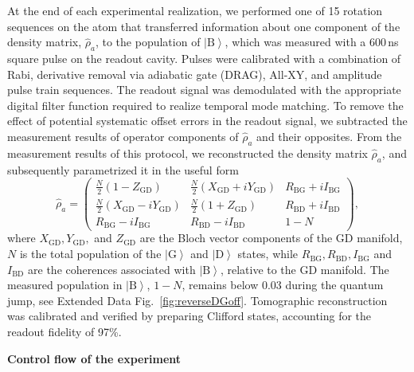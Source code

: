 \documentclass[
	 			preprint,     		superscriptaddress, 																longbibliography,
		amsmath, amssymb,
		aps,  prb,   		floatfix,
		linenumbers     
	]{revtex4-1}
\newcommand{\ket}[1]{\left|#1\right>}
\begin{document}
At the end of each experimental realization, we performed one of 15 rotation sequences on the atom that transferred information about one component of the density matrix, $\hat{\rho}_a$, to the population of $\ket{\mathrm{B}}$, which was measured with a 600\,ns square pulse on the readout cavity.
Pulses were calibrated with a combination of Rabi, derivative removal via adiabatic gate (DRAG), All-XY, and amplitude pulse train sequences. 
The readout signal was demodulated with the appropriate digital filter function required to realize temporal mode matching.
To remove the effect of potential systematic offset errors in the readout signal, we subtracted the measurement results of operator components of  $\hat{\rho}_a$ and their opposites.
From the measurement results of this protocol, we reconstructed the density matrix $\hat{\rho}_a$, and subsequently parametrized it in the useful form
$$\hat{\rho}_a = \begin{pmatrix}\frac{N}{2}\left(1-Z_{\mathrm{GD}}\right) & \frac{N}{2}\left(X_{\mathrm{GD}}+i Y_{\mathrm{GD}}\right) & R_{\mathrm{BG}}+i I_{\mathrm{BG}}\\
\frac{N}{2}\left(X_{\mathrm{ GD}}-i Y_{\mathrm{GD}}\right) & \frac{N}{2}\left(1+Z_{\mathrm{GD}}\right) & R_{\mathrm{BD}}+i I_{\mathrm{BD}}\\
R_{\mathrm{BG}}-i I_{\mathrm{BG}} & R_{\mathrm{BD}}-i I_{\mathrm{BD}} & 1-N
\end{pmatrix}, 
$$ where $X_\mathrm{GD}, Y_\mathrm{GD},$ and $Z_\mathrm{GD}$ are the Bloch vector components of the GD manifold, $N$ is the total population of  the $\ket{\mathrm{G}}$ and $\ket{\mathrm{D}}$ states, while $R_{\mathrm{BG}},  R_{\mathrm{BD}}, I_{\mathrm{BG}}$ and $I_{\mathrm{BD}}$ are the coherences associated with $\ket{\mathrm{B}}$, relative to the GD manifold. 
The measured population in $\ket{\mathrm{B}}$, $1-N$, remains below 0.03 during the quantum jump, see Extended Data Fig.~\ref{fig:reverseDGoff}.
Tomographic reconstruction was calibrated and verified by preparing Clifford states, accounting for the readout fidelity of 97\%.



\textbf{Control flow of the experiment}
 
\end{document}
